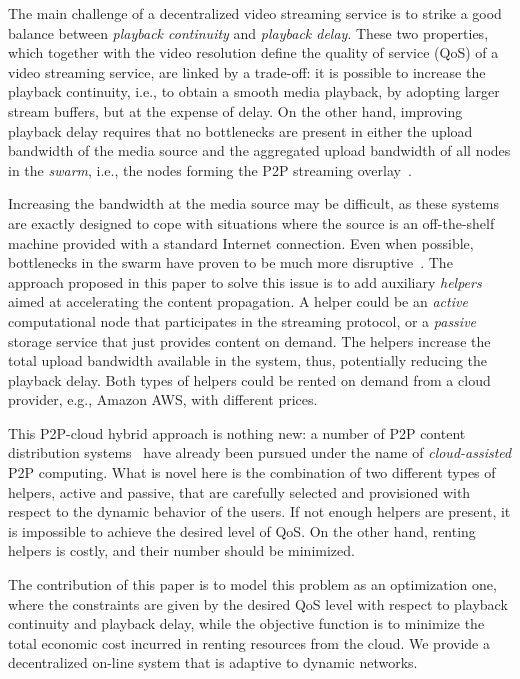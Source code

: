 The main challenge of a decentralized video streaming service is to strike a good balance between \emph{playback continuity} and \emph{playback
delay}. These two properties, which together with the video resolution define the quality of service (QoS) of a video streaming service, are linked by a trade-off:
it is possible to increase the playback continuity, i.e., to obtain a smooth
media playback, by adopting larg\-er stream buffers, but at the expense
of delay. On the other hand, improving playback delay requires that no
bottlenecks are present in either the upload bandwidth of the media source and
the aggregated upload bandwidth of all nodes in the \emph{swarm}, i.e., the
nodes forming the P2P streaming overlay~\cite{CloudAngel}.


Increasing the bandwidth at the media source may be difficult, as these systems
are exactly designed to cope with situations where the source is an off-the-shelf machine provided with a standard Internet connection. Even when
possible, bottlenecks in the swarm have proven to be much more
disruptive~\cite{Kumar:MDT}. The approach proposed in this paper to solve
this issue is to add auxiliary \emph{helpers} aimed at accelerating the content 
propagation.  A helper could
be an \emph{active} computational node that participates in the streaming
protocol, or a \emph{passive} storage service that just provides
content on demand. The helpers increase the total upload bandwidth available
in the system, thus, potentially reducing the playback delay. Both types of
helpers could be rented on demand from a cloud provider, e.g., Amazon AWS, with different prices. 

This P2P-cloud hybrid approach is nothing
new: a number of P2P content distribution systems~\cite{CloudAngel,cloudcast,Sripanidkulchai,sripanidkulchai2004analysis} have already been pursued under the name of \emph{cloud-assisted} P2P computing.
What is novel here is the combination of two different types of helpers, active and passive, that are carefully selected and provisioned
with respect to the dynamic behavior of the users. If not enough
helpers are present, it is impossible to achieve the desired level of
QoS. On the other hand, renting helpers is costly, and their number should be
minimized.

The contribution of this paper is to model this problem as an optimization one,
where the constraints are given by the desired QoS level with respect to playback continuity and playback delay, while the objective
function is to minimize the total economic cost incurred in renting resources from the cloud. We provide \clive a decentralized on-line system that is adaptive to dynamic networks.

